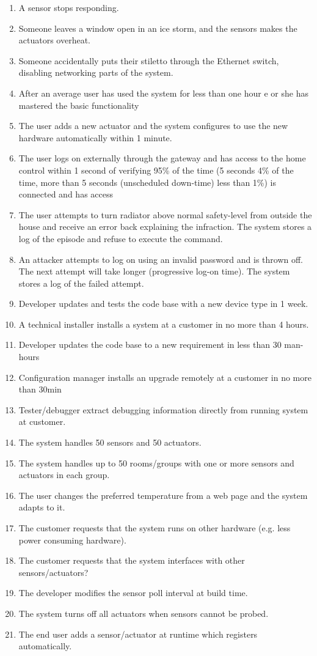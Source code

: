 \documentclass[a4paper,10pt]{article}
\begin{document}
\begin{enumerate}
\item A sensor stops responding.
\item Someone leaves a window open in an ice storm, and the sensors makes the actuators overheat.
\item Someone accidentally puts their stiletto through the Ethernet switch, disabling networking 
parts of the system.
\item After an average user has used the system for less than one hour e or she has mastered the basic functionality
\item The user adds a new actuator and the system configures to use the new hardware automatically within 1 minute.
\item The user logs on externally through the gateway and has access to the home control within 1 second of verifying 95\% of the time (5 seconds 4\% of the time, more than 5 seconds (unscheduled down-time) less than 1\%) is connected and has access
\item The user attempts to turn radiator above normal safety-level from outside the house and receive an error back explaining the infraction. The system stores a log of the episode and refuse to execute the command.
\item An attacker attempts to log on using an invalid password and is thrown off. The next attempt will take longer (progressive log-on time). The system stores a log of the failed attempt.
\item Developer updates and tests the code base with a new device type in 1 week.
\item A technical installer installs a system at a customer in no more than 4 hours.
\item Developer updates the code base to a new requirement in less than 30 man-hours
\item Configuration manager installs an upgrade remotely at a customer in no more than 30min
\item Tester/debugger extract debugging information directly from running system at customer.
\item The system handles 50 sensors and 50 actuators.
\item The system handles up to 50 rooms/groups with one or more sensors and actuators in each group.
\item The user changes the preferred temperature from a web page and the system adapts to it.
\item The customer requests that the system runs on other hardware (e.g. less power consuming hardware).
\item The customer requests that the system interfaces with other sensors/actuators?
\item The developer modifies the sensor poll interval at build time.
\item The system turns off all actuators when sensors cannot be probed.
\item The end user adds a sensor/actuator at runtime which registers automatically.
\end{enumerate}
\end{document}
